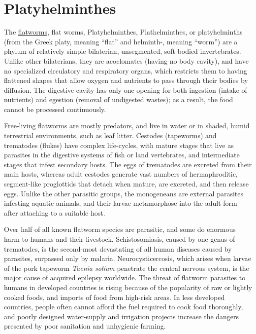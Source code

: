 \section{Platyhelminthes}\label{platyhelminthes}

The \href{https://en.wikipedia.org/wiki/Flatworm}{flatworms}, flat
worms, Platyhelminthes, Plathelminthes, or platyhelminths (from the
Greek platy, meaning ``flat'' and helminth-, meaning ``worm'') are a
phylum of relatively simple bilaterian, unsegmented, soft-bodied
invertebrates. Unlike other bilaterians, they are acoelomates (having no
body cavity), and have no specialized circulatory and respiratory
organs, which restricts them to having flattened shapes that allow
oxygen and nutrients to pass through their bodies by diffusion. The
digestive cavity has only one opening for both ingestion (intake of
nutrients) and egestion (removal of undigested wastes); as a result, the
food cannot be processed continuously.

Free-living flatworms are mostly predators, and live in water or in
shaded, humid terrestrial environments, such as leaf litter. Cestodes
(tapeworms) and trematodes (flukes) have complex life-cycles, with
mature stages that live as parasites in the digestive systems of fish or
land vertebrates, and intermediate stages that infest secondary hosts.
The eggs of trematodes are excreted from their main hosts, whereas adult
cestodes generate vast numbers of hermaphroditic, segment-like
proglottids that detach when mature, are excreted, and then release
eggs. Unlike the other parasitic groups, the monogeneans are external
parasites infesting aquatic animals, and their larvae metamorphose into
the adult form after attaching to a suitable host.

Over half of all known flatworm species are parasitic, and some do
enormous harm to humans and their livestock. Schistosomiasis, caused by
one genus of trematodes, is the second-most devastating of all human
diseases caused by parasites, surpassed only by malaria.
Neurocysticercosis, which arises when larvae of the pork tapeworm \emph{Taenia
solium} penetrate the central nervous system, is the major cause of
acquired epilepsy worldwide. The threat of flatworm parasites to humans
in developed countries is rising because of the popularity of raw or
lightly cooked foods, and imports of food from high-risk areas. In less
developed countries, people often cannot afford the fuel required to
cook food thoroughly, and poorly designed water-supply and irrigation
projects increase the dangers presented by poor sanitation and
unhygienic farming.

